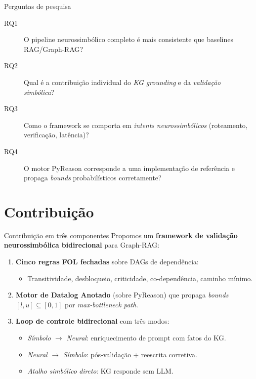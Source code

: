 \documentclass[aspectratio=169]{beamer}
\begin{document}
\begin{frame}{Perguntas de pesquisa}
  \begin{description}
    \item[RQ1] O pipeline neurossimbólico completo é mais consistente que baselines RAG/Graph-RAG?
    \item[RQ2] Qual é a contribuição individual do \emph{KG grounding} e da \emph{validação simbólica}?
    \item[RQ3] Como o framework se comporta em \emph{intents neurossimbólicos} (roteamento, verificação, latência)?
    \item[RQ4] O motor PyReason corresponde a uma implementação de referência e propaga \emph{bounds} probabilísticos corretamente?
  \end{description}
\end{frame}

\section{Contribuição}

\begin{frame}{Contribuição em três componentes}
  Propomos um \textbf{framework de validação neurossimbólica bidirecional} para Graph-RAG:
  \vspace{0.5em}
  \begin{enumerate}
    \item \textbf{Cinco regras FOL fechadas} sobre DAGs de dependência:
      \begin{itemize}\small
        \item Transitividade, desbloqueio, criticidade, co-dependência, caminho mínimo.
      \end{itemize}
    \item \textbf{Motor de Datalog Anotado} (sobre PyReason) que propaga \emph{bounds} $[l,u] \subseteq [0,1]$ por \emph{max-bottleneck path}.
    \item \textbf{Loop de controle bidirecional} com três modos:
      \begin{itemize}\small
        \item \emph{Símbolo $\to$ Neural}: enriquecimento de prompt com fatos do KG.
        \item \emph{Neural $\to$ Símbolo}: pós-validação + reescrita corretiva.
        \item \emph{Atalho simbólico direto}: KG responde sem LLM.
      \end{itemize}
  \end{enumerate}
\end{frame}
\end{document}
